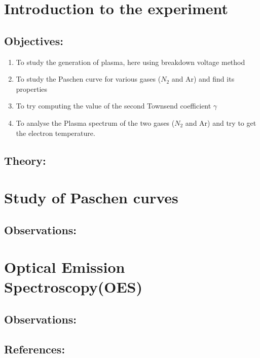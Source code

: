\documentclass[]{report}[12 pt]
\begin{document}
	
	\tableofcontents
\chapter{Introduction to the experiment}
	\section*{Objectives:}
\begin{enumerate}
	\item To study the generation of plasma, here using breakdown voltage method
	\item To study the Paschen curve for various gases ($N_2$ and Ar) and find its properties
	\item To try computing the value of the second Townsend coefficient $\gamma$
	\item To analyse the Plasma spectrum of the two gases ($N_2$ and Ar) and try to get the electron temperature.
\end{enumerate}

\section*{Theory:}

\chapter{Study of Paschen curves}
\section{Observations:}
\chapter{Optical Emission Spectroscopy(OES)}
\section{Observations:}
\section*{References:}
\end{document}
